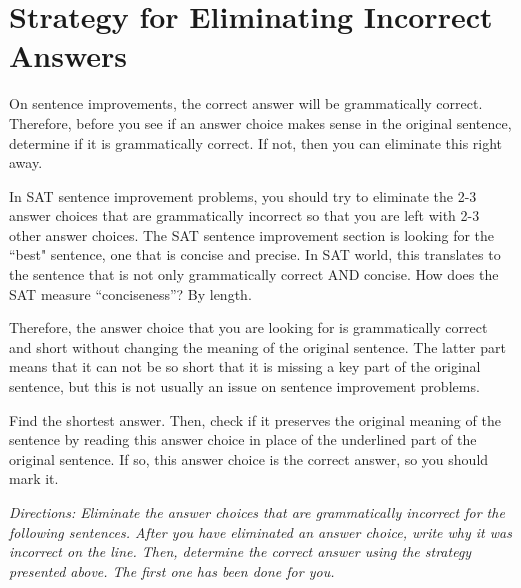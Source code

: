 \section{Strategy for Eliminating Incorrect Answers}

On sentence improvements, the correct answer will be grammatically correct. Therefore, before
you see if an answer choice makes sense in the original sentence, determine if it is grammatically
correct. If not, then you can eliminate this right away.

In SAT sentence improvement problems, you should try to eliminate the 2-3 answer choices that are grammatically incorrect so that you are left with 2-3 other answer choices. The SAT sentence improvement section is looking for the ``best" sentence, one that is concise and precise. In SAT world, this translates to the sentence that is not only grammatically correct AND concise. How does the SAT measure ``conciseness''? By length.

\bigskip
Therefore, the answer choice that you are looking for is grammatically correct and short without changing the meaning of the original sentence. The latter part means that it can not be so short that it is missing a key part of the original sentence,
but this is not usually an issue on sentence improvement problems.

\bigskip
Find the shortest answer. Then, check if it preserves the original meaning of the sentence by reading this answer choice in place of the underlined part of the original sentence. If so, this answer choice is the correct answer, so you should mark it.

\bigskip
\textit{Directions: Eliminate the answer choices that are grammatically incorrect for the following sentences. After you have eliminated an answer choice, write why it was incorrect on the line. Then, determine the correct answer using the strategy presented above. The first one has been done for you.}


